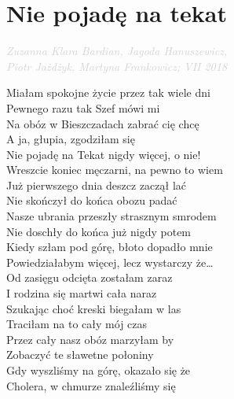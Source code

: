 \documentclass[a5paper, 10pt]{book}
\begin{document}
\newpage
\section{Nie pojadę na tekat}\textcolor{lightgray}{\textit{Zuzanna Klara Bardian, Jagoda Hanuszewicz,\\ \hspace*{\fill} Piotr Jażdżyk, Martyna Frankowicz; VII 2018}}\\
\begin{minipage}[t]{0.8\textwidth}
  Miałam spokojne życie przez tak wiele dni	\\
  Pewnego razu tak Szef mówi mi	\\
  Na obóz w Bieszczadach zabrać cię chcę 	\\
  A ja, głupia, zgodziłam się	\\

  \hspace*{5mm}Nie pojadę na Tekat nigdy więcej, o nie!		\\
  \hspace*{5mm}Wreszcie koniec męczarni, na pewno to wiem	\\

  Już pierwszego dnia deszcz zaczął lać 		\\
  Nie skończył do końca obozu padać\\
  Nasze ubrania przeszły strasznym smrodem 	\\
  Nie doschły do końca już nigdy potem\\

  \hspace*{5mm}Kiedy szłam pod górę, błoto dopadło mnie 	\\
  \hspace*{5mm}Powiedziałabym więcej, lecz wystarczy że…\\

  Od zasięgu odcięta zostałam zaraz 		\\
  I rodzina się martwi cała naraz	\\
  Szukając choć kreski biegałam w las 		\\
  Traciłam na to cały mój czas	\\

  Przez cały nasz obóz marzyłam by		\\
  Zobaczyć te sławetne połoniny	\\
  Gdy wyszliśmy na górę, okazało się że		\\
  Cholera, w chmurze znaleźliśmy się\\


\end{minipage}
\end{document}
